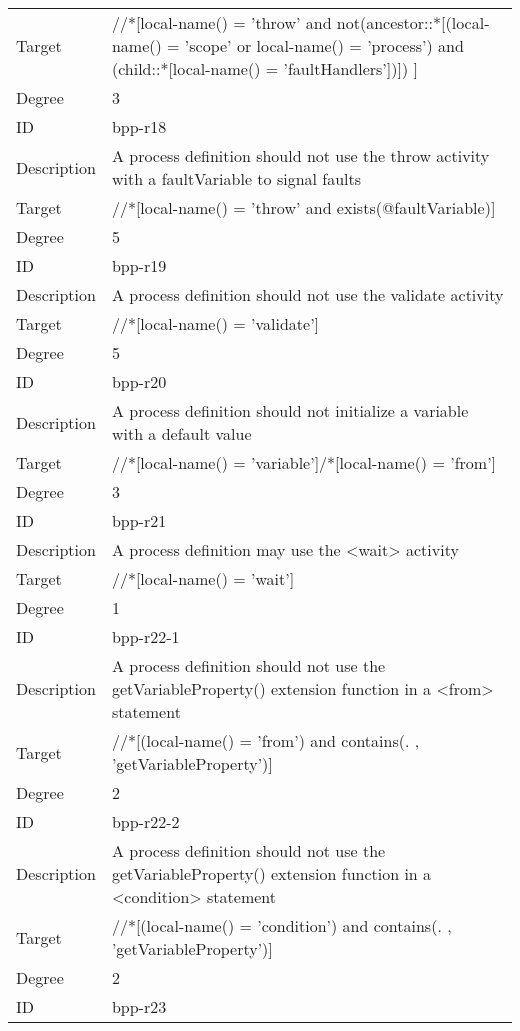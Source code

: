 \begin{center}
\begin{tiny}
\begin{longtable}{p{}|p{}}
Target & //*[local-name() = 'throw' and not(ancestor::*[(local-name() = 'scope' or local-name() = 'process') and (child::*[local-name() = 'faultHandlers'])]) ]\\
\myrowcolour
Degree & 3\\
\midrule
ID & bpp-r18\\
\myrowcolour
Description &A process definition should not use the throw activity with a faultVariable to signal faults\\
Target & //*[local-name() = 'throw' and exists(@faultVariable)]\\
\myrowcolour
Degree & 5\\
\midrule
ID & bpp-r19\\
\myrowcolour
Description &A process definition should not use the validate activity\\
Target & //*[local-name() = 'validate']\\
\myrowcolour
Degree & 5\\
\midrule
ID & bpp-r20\\
\myrowcolour
Description &A process definition should not initialize a variable with a default value\\
Target & //*[local-name() = 'variable']/*[local-name() = 'from']\\
\myrowcolour
Degree & 3\\
\midrule
ID & bpp-r21\\
\myrowcolour
Description &A process definition may use the <wait> activity\\
Target & //*[local-name() = 'wait']\\
\myrowcolour
Degree & 1\\
\midrule
ID & bpp-r22-1\\
\myrowcolour
Description &A process definition should not use the getVariableProperty() extension function in a <from> statement\\
Target & //*[(local-name() = 'from') and contains(. , 'getVariableProperty')]\\
\myrowcolour
Degree & 2\\
\midrule
ID & bpp-r22-2\\
\myrowcolour
Description &A process definition should not use the getVariableProperty() extension function in a <condition> statement\\
Target & //*[(local-name() = 'condition') and contains(. , 'getVariableProperty')]\\
\myrowcolour
Degree & 2\\
\midrule
ID & bpp-r23\\

\end{longtable}
\end{tiny}
\end{center}
